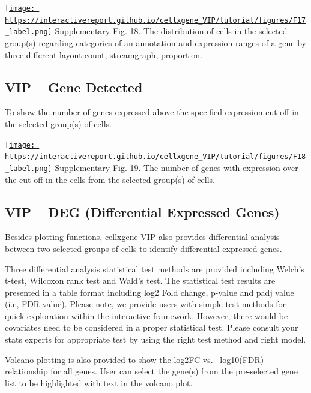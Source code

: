 \documentclass[
]{article}
\begin{document}
\href{https://interactivereport.github.io/cellxgene_VIP/tutorial/figures/F17_label.png}{\texttt{[image: https://interactivereport.github.io/cellxgene\_VIP/tutorial/figures/F17\_label.png]}}
Supplementary Fig. 18. The distribution of cells in the selected group(s) regarding categories of an annotation and expression ranges of a gene by three different layout:count, streamgraph, proportion.

\hypertarget{vip-gene-detected}{%
\subsection{VIP -- Gene Detected}\label{vip-gene-detected}}

To show the number of genes expressed above the specified expression cut-off in the selected group(s) of cells.

\href{https://interactivereport.github.io/cellxgene_VIP/tutorial/figures/F18_label.png}{\texttt{[image: https://interactivereport.github.io/cellxgene\_VIP/tutorial/figures/F18\_label.png]}}
Supplementary Fig. 19. The number of genes with expression over the cut-off in the cells from the selected group(s) of cells.

\hypertarget{vip-deg-differential-expressed-genes}{%
\subsection{VIP -- DEG (Differential Expressed Genes)}\label{vip-deg-differential-expressed-genes}}

Besides plotting functions, cellxgene VIP also provides differential analysis between two selected groups of cells to identify differential expressed genes.

Three differential analysis statistical test methods are provided including Welch's t-test, Wilcoxon rank test and Wald's test. The statistical test results are presented in a table format including log2 Fold change, p-value and padj value (i.e, FDR value). Please note, we provide users with simple test methods for quick exploration within the interactive framework. However, there would be covariates need to be considered in a proper statistical test. Please consult your stats experts for appropriate test by using the right test method and right model.

Volcano plotting is also provided to show the log2FC vs.~-log10(FDR) relationship for all genes. User can select the gene(s) from the pre-selected gene list to be highlighted with text in the volcano plot.
\end{document}
